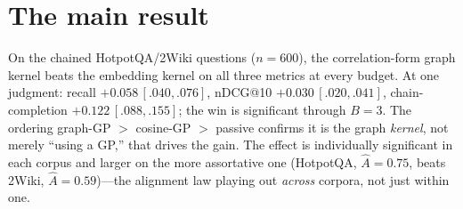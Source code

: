 \documentclass[11pt]{article}
\theoremstyle{plain}
\theoremstyle{definition}
\theoremstyle{remark}
\begin{document}
\section{The main result}\label{sec:main}
On the chained HotpotQA/2Wiki questions ($n=600$), the correlation-form graph kernel beats the embedding kernel on
all three metrics at every budget. At one judgment: recall $+0.058\,[.040,.076]$, nDCG@10 $+0.030\,[.020,.041]$,
chain-completion $+0.122\,[.088,.155]$; the win is significant through $B=3$. The ordering
graph-GP $>$ cosine-GP $>$ passive confirms it is the graph \emph{kernel}, not merely ``using a GP,'' that drives
the gain. The effect is individually significant in each corpus and larger on the more assortative one (HotpotQA,
$\widehat A=0.75$, beats 2Wiki, $\widehat A=0.59$)---the alignment law playing out \emph{across} corpora, not just
within one.
\end{document}
